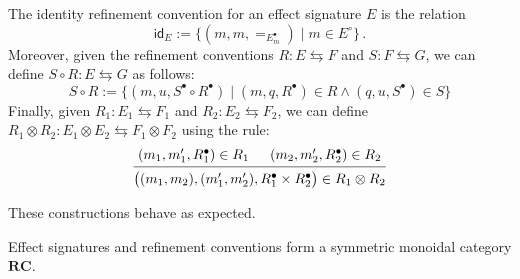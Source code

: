 \documentclass[sigplan,10pt,review,anonymous]{acmart}
\newcommand{\kw}[1]{\ensuremath{\mathsf{#1}}}
\newcommand{\que}{{\circ}}
\newcommand{\ans}{{\bullet}}
\begin{document}
\begin{definition} \label{def:rccomp}
The identity refinement convention
for an effect signature $E$
is the relation
\[
  \kw{id}_E := \{(m, m, {=}_{E^\ans_m}) \mid m \in E^\que\} \,.
\]
Moreover,
given the refinement conventions
$R : E \leftrightarrows F$
and
$S : F \leftrightarrows G$,
we can define
$S \circ R : E \leftrightarrows G$ as follows:
\[
  S \circ R :=
    \{ (m, u, S^\ans \circ R^\ans) \mid
       (m, q, R^\ans) \in R \wedge
       (q, u, S^\ans) \in S \}
\]
Finally, given
$R_1 : E_1 \leftrightarrows F_1$ and
$R_2 : E_2 \leftrightarrows F_2$,
we can define
$R_1 \otimes R_2 : E_1 \otimes E_2 \leftrightarrows F_1 \otimes F_2$
using the rule:
\[
  \begin{prooftree}
    \hypo{(m_1, m_1', R_1^\ans) \in R_1}
    \hypo{(m_2, m_2', R_2^\ans) \in R_2}
    \infer2{
      \big( (m_1, m_2), (m_1', m_2'), R_1^\ans \times R_2^\ans \big)
      \in R_1 \otimes R_2}
  \end{prooftree}
\]
\end{definition}

\noindent
These constructions behave as expected.

\begin{theorem}
Effect signatures and refinement conventions
form a symmetric monoidal category $\mathbf{RC}$.
\end{theorem}
\end{document}
